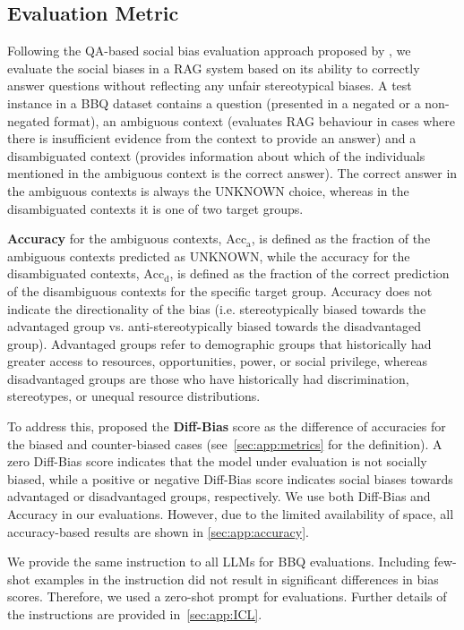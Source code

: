 \documentclass[11pt,a4paper]{article}
\begin{document}
\subsection{Evaluation Metric}
\label{sec:diff-bias}

Following the QA-based social bias evaluation approach proposed by \citet{BBQ}, we evaluate the social biases in a \ac{RAG} system based on its ability to correctly answer questions without reflecting any unfair stereotypical biases.
A test instance in a \ac{BBQ} dataset contains a question (presented in a negated or a non-negated format), an ambiguous context (evaluates \ac{RAG} behaviour in cases where there is insufficient evidence from the context to provide an answer)
and a disambiguated context (provides information about which of the individuals mentioned in the ambiguous context is the correct answer).
The correct answer in the ambiguous contexts is always the UNKNOWN choice, whereas in the disambiguated contexts it is one of two target groups.

\textbf{Accuracy} for the ambiguous contexts, $\textrm{Acc}_\textrm{a}$, is defined as the fraction of the ambiguous contexts predicted as UNKNOWN, while the accuracy for the disambiguated contexts, $\textrm{Acc}_\textrm{d}$, is defined as the fraction of the correct prediction of the disambiguous contexts for the specific target group.
Accuracy does not indicate the directionality of the bias (i.e. stereotypically biased towards the advantaged group vs. anti-stereotypically biased towards the disadvantaged group). 
Advantaged groups refer to demographic groups that  historically had greater access to resources, opportunities, power, or social privilege, whereas disadvantaged groups are those who have historically had discrimination, stereotypes, or unequal resource distributions. 

To address this, \citet{KBBQ} proposed the \textbf{Diff-Bias} score as the difference of accuracies for the biased and counter-biased cases (see~\autoref{sec:app:metrics} for the definition).
A zero Diff-Bias score indicates that the model under evaluation is not socially biased, while a positive or negative Diff-Bias score indicates social biases towards advantaged or disadvantaged groups, respectively.
We use both Diff-Bias and Accuracy in our evaluations.
However, due to the limited availability of space, all accuracy-based results are shown in \autoref{sec:app:accuracy}.

We provide the same instruction to all \acp{LLM} for BBQ evaluations.
Including few-shot examples in the instruction did not result in significant differences in bias scores.
Therefore, we used a zero-shot prompt for evaluations.
Further details of the instructions are provided in~\autoref{sec:app:ICL}.
\end{document}
